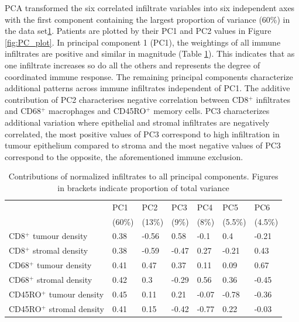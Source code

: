  PCA transformed the six correlated infiltrate variables into six independent axes with the first component containing the largest proportion of variance (60\%) in the data set\ref{tab:PC}. Patients are plotted by their PC1 and PC2 values in Figure \ref{fig:PC_plot}. In principal component 1 (PC1), the weightings of all immune infiltrates are positive and similar in magnitude (Table \ref{tab:PC}). This indicates that as one infiltrate increases so do all the others and represents the degree of coordinated immune response. The remaining principal components characterize additional patterns across immune infiltrates independent of PC1. The additive contribution of PC2 characterises negative correlation between CD8$^+$ infiltrates and CD68$^+$ macrophages and CD45RO$^+$ memory cells. PC3 characterizes additional variation where epithelial and stromal infiltrates are negatively correlated, the most positive values of PC3 correspond to high infiltration in tumour epithelium compared to stroma and the most negative values of PC3 correspond to the opposite, the aforementioned immune exclusion. 
 
\begin{table}[]
    \centering
    \begin{tabular}{lllllll}\hline
&PC1& PC2&PC3&PC4&PC5&PC6\\
&(60\%)&(13\%)&(9\%)&(8\%)&(5.5\%)&(4.5\%)\\
\hline
CD8$^+$ tumour density& 0.38&-0.56&0.58&-0.1&0.4&-0.21\\
CD8$^+$ stromal density&0.38&-0.59&-0.47&0.27&-0.21&0.43\\
CD68$^+$ tumour density&0.41&0.47&0.37&0.11&0.09&0.67\\
CD68$^+$ stromal density&0.42&0.3&-0.29&0.56&0.36&-0.45\\
CD45RO$^+$ tumour density&0.45&0.11&0.21&-0.07&-0.78&-0.36\\
CD45RO$^+$ stromal density&0.41&0.15&-0.42&-0.77&0.22&-0.03\\
\hline
    \end{tabular}
    \caption[Composition of the principal components across all infiltrates]{Contributions of normalized infiltrates to all principal components. Figures in brackets indicate proportion of total variance}
    \label{tab:PC}
\end{table}

